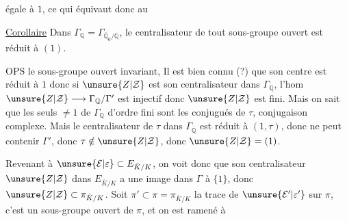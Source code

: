 égale à $1$, ce qui équivaut donc au

\uline{Corollaire} Dans $\Gamma_{\mathbb Q}=\Gamma_{\overline{\mathbb Q}_0/\mathbb Q}$, le centralisateur de tout sous-groupe ouvert est réduit à $(1)$.

OPS le sous-groupe ouvert  invariant, Il est bien connu (?) que son centre est réduit à $1$
donc si $\unsure{Z|\mathcal Z}$ est son centralisateur dans $\Gamma_{\mathbb Q}$, l'hom $\unsure{Z|\mathcal Z}\longrightarrow\Gamma_{\mathbb Q}/\Gamma'$ est injectif donc $\unsure{Z|\mathcal Z}$ est fini. Mais on sait que les seuls  $\neq1$ de $\Gamma_{\mathbb Q}$ d'ordre fini sont les conjugués de $\tau$, conjugaison complexe. Mais le centralisateur de $\tau$ dans $\Gamma_{\overline{\mathbb Q}}$ est réduit à $(1,\tau)$, donc ne peut contenir $\Gamma'$, donc $\tau\notin\unsure{Z|\mathcal Z}$, donc $\unsure{Z|\mathcal Z}=(1)$.

Revenant à $\unsure{\mathcal E|\varepsilon}\subset E_{\bar K/K}$, on voit donc que son centralisateur $\unsure{Z|\mathcal Z}$ dans $E_{\bar K/K}$ a une image dans $\Gamma$  à $\{1\}$, donc $\unsure{Z|\mathcal Z}\subset\pi_{\bar K/K}$. Soit $\pi'\subset\pi=\pi_{\bar K/K}$ la trace de $\unsure{\mathcal E'|\varepsilon'}$ sur $\pi$, c'est un sous-groupe ouvert de $\pi$, et on est ramené à
